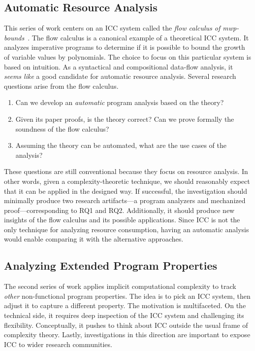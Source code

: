 \subsection{Automatic Resource Analysis}
\label{subsec:aicc-automatic-resource-analysis}

This series of work centers on an ICC system called the \emph{flow calculus of mwp-bounds}~\cite{jones2009}.
The flow calculus is a canonical example of a theoretical ICC system.
It analyzes imperative programs to determine if it is possible to bound the growth of variable values by polynomials.
The choice to focus on this particular system is based on intuition.
As a syntactical and compositional data-flow analysis, it \emph{seems like} a good candidate for automatic resource analysis.
Several research questions arise from the flow calculus.

\begin{enumerate}[label={(RQ\arabic*)}]
\item Can we develop an \emph{automatic} program analysis based on the theory?
\item Given its paper proofs, is the theory correct?
      Can we prove formally the soundness of the flow calculus?
\item Assuming the theory can be automated, what are the use cases of the analysis?
\end{enumerate}
These questions are still conventional because they focus on resource analysis.
In other words, given a complexity-theoretic technique, we should reasonably expect that it can be applied in the designed way.
If successful, the investigation should minimally produce two research artifacts---a program analyzers and mechanized proof---corresponding to RQ1 and RQ2.
Additionally, it should produce new insights of the flow calculus and its possible applications.
Since ICC is not the only technique for analyzing resource consumption,
having an automatic analysis would enable comparing it with the alternative approaches.

\subsection{Analyzing Extended Program Properties}
\label{subsec:extended-props}

The second series of work applies implicit computational complexity to track \emph{other} non-functional program properties.
The idea is to pick an ICC system, then adjust it to capture a different  property.
The motivation is multifaceted.
On the technical side, it requires deep inspection of the ICC system and challenging its flexibility.
Conceptually, it pushes to think about ICC outside the usual frame of complexity theory.
Lastly, investigations in this direction are important to expose ICC to wider research communities.

